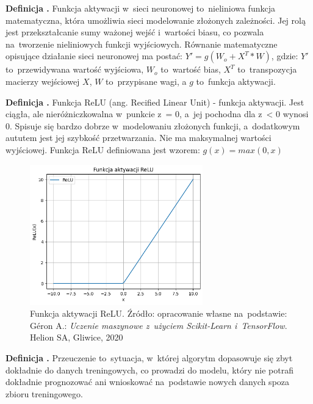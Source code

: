 \noindent
\textbf{Definicja .}
\incrementdefinitionIndex
Funkcja aktywacji w~sieci neuronowej to~nieliniowa funkcja matematyczna,
która umożliwia sieci modelowanie złożonych zależności.
Jej rolą jest przekształcanie sumy ważonej wejść i~wartości biasu,
co pozwala na~tworzenie nieliniowych funkcji wyjściowych.
Równanie matematyczne opisujące działanie sieci neuronowej ma postać: $Y' = g(W_o + X^T * W)$, gdzie:
$Y'$ to~przewidywana wartość wyjściowa,
$W_o$ to~wartość bias,
$X^T$ to~transpozycja macierzy wejściowej $X$,
$W$ to~przypisane wagi,
a $g$ to~funkcja aktywacji.

\noindent
\textbf{Definicja .}
\incrementdefinitionIndex
Funkcja ReLU (ang. Recified Linear Unit) - funkcja aktywacji.
Jest ciągła, ale nieróżniczkowalna w~punkcie z~= 0, a~jej pochodna dla z~< 0 wynosi 0.
Spisuje się bardzo dobrze w~modelowaniu złożonych funkcji, a~dodatkowym aututem jest jej szybkość przetwarzania.
Nie ma maksymalnej wartości wyjściowej.
Funkcja ReLU definiowana jest wzorem:
$g(x) = max(0, x)$

\begin{figure}[ht]
	\centering
	\includegraphics[width=7.5cm]{resources/machine-learning/images/def_relu.png}
	\caption{Funkcja aktywacji ReLU.
		Źródło: opracowanie własne na~podstawie:
        Géron A.: \textit{Uczenie maszynowe z~użyciem Scikit-Learn i~TensorFlow}. Helion SA, Gliwice, 2020}
    \label{Fig:def-1}
\end{figure}
\FloatBarrier

\noindent
\textbf{Definicja .}
\incrementdefinitionIndex
Przeuczenie to~sytuacja, w~której algorytm dopasowuje się zbyt dokładnie do danych treningowych,
co prowadzi do modelu, który nie potrafi dokładnie prognozować ani wnioskować na~podstawie nowych danych spoza zbioru treningowego.

